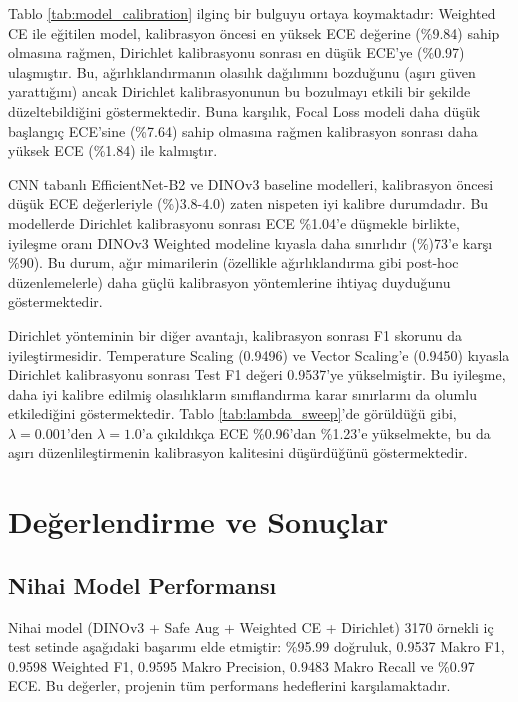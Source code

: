 \documentclass[conference]{IEEEtran}
\begin{document}
Tablo \ref{tab:model_calibration} ilginç bir bulguyu ortaya koymaktadır: Weighted CE ile eğitilen model, kalibrasyon öncesi en yüksek ECE değerine (\%9.84) sahip olmasına rağmen, Dirichlet kalibrasyonu sonrası en düşük ECE'ye (\%0.97) ulaşmıştır. Bu, ağırlıklandırmanın olasılık dağılımını bozduğunu (aşırı güven yarattığını) ancak Dirichlet kalibrasyonunun bu bozulmayı etkili bir şekilde düzeltebildiğini göstermektedir. Buna karşılık, Focal Loss modeli daha düşük başlangıç ECE'sine (\%7.64) sahip olmasına rağmen kalibrasyon sonrası daha yüksek ECE (\%1.84) ile kalmıştır.

CNN tabanlı EfficientNet-B2 ve DINOv3 baseline modelleri, kalibrasyon öncesi düşük ECE değerleriyle (\%)3.8-4.0) zaten nispeten iyi kalibre durumdadır. Bu modellerde Dirichlet kalibrasyonu sonrası ECE \%1.04'e düşmekle birlikte, iyileşme oranı DINOv3 Weighted modeline kıyasla daha sınırlıdır (\%)73'e karşı \%90). Bu durum, ağır mimarilerin (özellikle ağırlıklandırma gibi post-hoc düzenlemelerle) daha güçlü kalibrasyon yöntemlerine ihtiyaç duyduğunu göstermektedir.

Dirichlet yönteminin bir diğer avantajı, kalibrasyon sonrası F1 skorunu da iyileştirmesidir. Temperature Scaling (0.9496) ve Vector Scaling'e (0.9450) kıyasla Dirichlet kalibrasyonu sonrası Test F1 değeri 0.9537'ye yükselmiştir. Bu iyileşme, daha iyi kalibre edilmiş olasılıkların sınıflandırma karar sınırlarını da olumlu etkilediğini göstermektedir. Tablo \ref{tab:lambda_sweep}'de görüldüğü gibi, $\lambda=0.001$'den $\lambda=1.0$'a çıkıldıkça ECE \%0.96'dan \%1.23'e yükselmekte, bu da aşırı düzenlileştirmenin kalibrasyon kalitesini düşürdüğünü göstermektedir.

\section{Değerlendirme ve Sonuçlar}

\subsection{Nihai Model Performansı}
Nihai model (DINOv3 + Safe Aug + Weighted CE + Dirichlet) 3170 örnekli iç test setinde aşağıdaki başarımı elde etmiştir: \%95.99 doğruluk, 0.9537 Makro F1, 0.9598 Weighted F1, 0.9595 Makro Precision, 0.9483 Makro Recall ve \%0.97 ECE. Bu değerler, projenin tüm performans hedeflerini karşılamaktadır.
\end{document}
